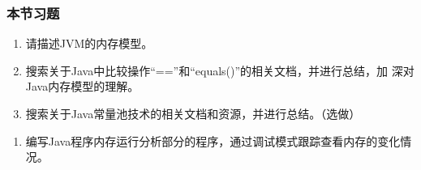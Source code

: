 

\begin{frame}
  \frametitle{本节习题}

  \begin{enumerate}
  \item 请描述JVM的内存模型。
  \item 搜索关于Java中比较操作“==”和“equals()”的相关文档，并进行总结，加
    深对Java内存模型的理解。
  \item 搜索关于Java常量池技术的相关文档和资源，并进行总结。（选做）
  \end{enumerate}

  \begin{enumerate}
  \item 编写Java程序内存运行分析部分的程序，通过调试模式跟踪查看内存的变化情况。
  \end{enumerate}
\end{frame}

